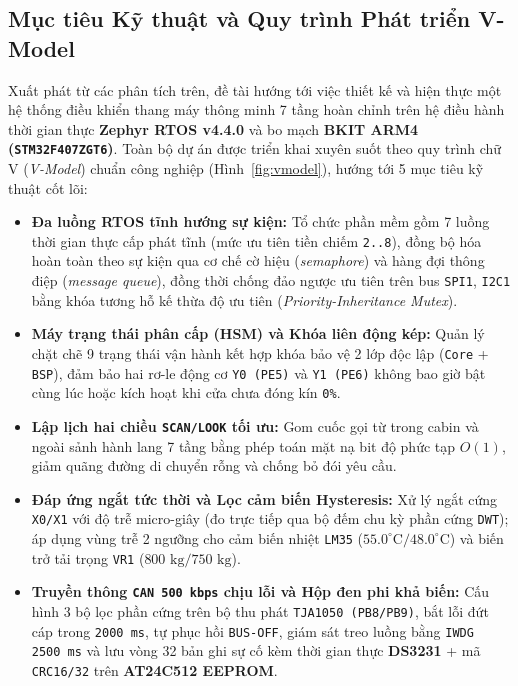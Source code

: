 \subsection{Mục tiêu Kỹ thuật và Quy trình Phát triển V-Model}
Xuất phát từ các phân tích trên, đề tài hướng tới việc thiết kế và hiện thực một hệ thống điều khiển thang máy thông minh 7 tầng hoàn chỉnh trên hệ điều hành thời gian thực \textbf{Zephyr RTOS v4.4.0} và bo mạch \textbf{BKIT ARM4 (\texttt{STM32F407ZGT6})}. Toàn bộ dự án được triển khai xuyên suốt theo quy trình chữ V (\textit{V-Model}) chuẩn công nghiệp (Hình~\ref{fig:vmodel}), hướng tới 5 mục tiêu kỹ thuật cốt lõi:
\begin{itemize}[nosep]
    \item \textbf{Đa luồng RTOS tĩnh hướng sự kiện:} Tổ chức phần mềm gồm 7 luồng thời gian thực cấp phát tĩnh (mức ưu tiên tiền chiếm \texttt{2..8}), đồng bộ hóa hoàn toàn theo sự kiện qua cơ chế cờ hiệu (\textit{semaphore}) và hàng đợi thông điệp (\textit{message queue}), đồng thời chống đảo ngược ưu tiên trên bus \texttt{SPI1}, \texttt{I2C1} bằng khóa tương hỗ kế thừa độ ưu tiên (\textit{Priority-Inheritance Mutex}).
    \item \textbf{Máy trạng thái phân cấp (HSM) và Khóa liên động kép:} Quản lý chặt chẽ 9 trạng thái vận hành kết hợp khóa bảo vệ 2 lớp độc lập (\texttt{Core} + \texttt{BSP}), đảm bảo hai rơ-le động cơ \texttt{Y0 (PE5)} và \texttt{Y1 (PE6)} không bao giờ bật cùng lúc hoặc kích hoạt khi cửa chưa đóng kín \texttt{0\%}.
    \item \textbf{Lập lịch hai chiều \texttt{SCAN/LOOK} tối ưu:} Gom cuốc gọi từ trong cabin và ngoài sảnh hành lang 7 tầng bằng phép toán mặt nạ bit độ phức tạp $O(1)$, giảm quãng đường di chuyển rỗng và chống bỏ đói yêu cầu.
    \item \textbf{Đáp ứng ngắt tức thời và Lọc cảm biến Hysteresis:} Xử lý ngắt cứng \texttt{X0/X1} với độ trễ micro-giây (đo trực tiếp qua bộ đếm chu kỳ phần cứng \texttt{DWT}); áp dụng vùng trễ 2 ngưỡng cho cảm biến nhiệt \texttt{LM35} ($55.0^\circ\text{C}/48.0^\circ\text{C}$) và biến trở tải trọng \texttt{VR1} ($800\text{ kg}/750\text{ kg}$).
    \item \textbf{Truyền thông \texttt{CAN 500 kbps} chịu lỗi và Hộp đen phi khả biến:} Cấu hình 3 bộ lọc phần cứng trên bộ thu phát \texttt{TJA1050 (PB8/PB9)}, bắt lỗi đứt cáp trong \texttt{2000~ms}, tự phục hồi \texttt{BUS-OFF}, giám sát treo luồng bằng \texttt{IWDG 2500~ms} và lưu vòng 32 bản ghi sự cố kèm thời gian thực \textbf{DS3231} + mã \texttt{CRC16/32} trên \textbf{AT24C512 EEPROM}.
\end{itemize}

